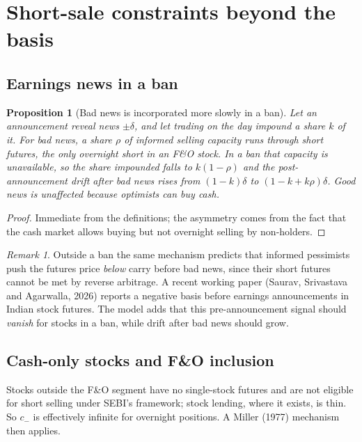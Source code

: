 \documentclass[11pt,a4paper]{article}
\theoremstyle{plain}
\newtheorem{proposition}{Proposition}
\theoremstyle{definition}
\theoremstyle{remark}
\newtheorem*{remark}{Remark}
\begin{document}
\section{Short-sale constraints beyond the basis}\label{sec:short}
\subsection{Earnings news in a ban}
\begin{proposition}[Bad news is incorporated more slowly in a ban]\label{prop:news}
Let an announcement reveal news $\pm\delta$, and let trading on the day impound a share $k$ of it. For bad news, a share
$\rho$ of informed selling capacity runs through short futures, the only overnight short in an F\&O stock. In a ban that
capacity is unavailable, so the share impounded falls to $k(1-\rho)$ and the post-announcement drift after bad news rises
from $(1-k)\delta$ to $(1-k+k\rho)\delta$. Good news is unaffected because optimists can buy cash.
\end{proposition}
\begin{proof}
Immediate from the definitions; the asymmetry comes from the fact that the cash market allows buying but not overnight
selling by non-holders.
\end{proof}
\begin{remark}
Outside a ban the same mechanism predicts that informed pessimists push the futures price \emph{below} carry before bad
news, since their short futures cannot be met by reverse arbitrage. A recent working paper (Saurav, Srivastava and
Agarwalla, 2026) reports a negative basis before earnings announcements in Indian stock futures. The model adds that this pre-announcement signal should \emph{vanish} for stocks in a ban, while drift after
bad news should grow.
\end{remark}

\subsection{Cash-only stocks and F\&O inclusion}
Stocks outside the F\&O segment have no single-stock futures and are not eligible for short selling under SEBI's
framework; stock lending, where it exists, is thin. So $c_-$ is effectively infinite for overnight positions. A Miller (1977) mechanism then applies.
\end{document}

